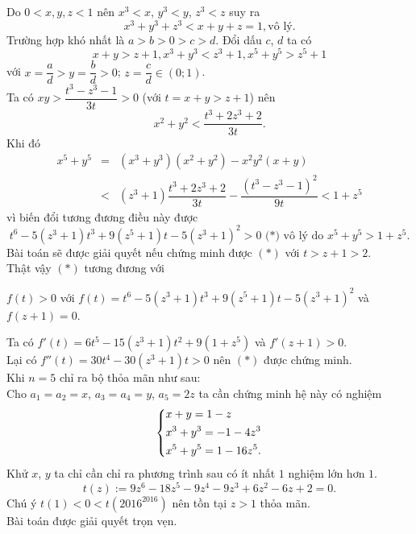 \begin{bt}
{		Do $0<x,y,z<1$ nên $x^3<x$, $y^3<y$, $z^3<z$ suy ra 
		$$x^3+y^3+z^3<x+y+z=1, \text{vô lý}.$$
		Trường hợp khó nhất là $a>b>0>c>d$. Đổi dấu $c$, $d$ ta có
		$$x+y>z+1, x^3+y^3<z^3+1, x^5+y^5>z^5+1$$
		với $x=\dfrac{a}{d}>y=\dfrac{b}{d}>0$; $z=\dfrac{c}{d}\in (0;1)$.\\
		Ta có $xy>\dfrac{t^3-z^3-1}{3t}>0$ (với $t=x+y>z+1$) nên
		$$x^2+y^2<\dfrac{t^3+2z^3+2}{3t}.$$
		Khi đó
		\begin{eqnarray*}
			x^5+y^5 &=& \left(x^3+y^3\right)\left( x^2+y^2 \right)-x^2y^2(x+y)\\
			&<& \left( z^3+1 \right)\dfrac{t^3+2z^3+2}{3t}-\dfrac{\left( t^3-z^3-1 \right)^2}{9t} < 1+z^5
		\end{eqnarray*}
		vì biến đổi tương đương điều này được
		$$t^6-5\left( z^3+1 \right)t^3+9\left( z^5+1 \right)t-5\left( z^3+1 \right)^2>0 \text{ (*) vô lý do } x^5+y^5>1+z^5.$$
		Bài toán sẽ được giải quyết nếu chứng minh được $(*)$ với $t>z+1>2$.\\
		Thật vậy $(*)$ tương đương với
		\begin{center}
			$f(t)>0$ với $f(t)=t^6-5\left(z^3+1 \right)t^3+9\left( z^5+1 \right)t-5\left( z^3+1 \right)^2$ và $f(z+1)=0$.
		\end{center}
		Ta có $f'(t)=6t^5-15\left( z^3+1 \right)t^2+9\left( 1+z^5 \right)$ và $f'(z+1)>0$.\\
		Lại có $f''(t)=30t^4-30\left( z^3+1 \right)t>0$ nên $(*)$ được chứng minh.\\
		Khi $n=5$ chỉ ra bộ thỏa mãn như sau:\\
		Cho $a_1=a_2=x$, $a_3=a_4=y$, $a_5=2z$ ta cần chứng minh hệ này có nghiệm
		$$\left\{\begin{aligned}&x+y=1-z\\&x^3+y^3=-1-4z^3\\&x^5+y^5=1-16z^5.\end{aligned}\right.$$
		Khử $x$, $y$ ta chỉ cần chỉ ra phương trình sau có ít nhất $1$ nghiệm lớn hơn $1$.
		$$t(z):=9z^6-18z^5-9z^4-9z^3+6z^2-6z+2=0.$$
		Chú ý $t(1)<0<t\left( 2016^{2016} \right)$ nên tồn tại $z>1$ thỏa mãn.\\
		Bài toán được giải quyết trọn vẹn.		
	}
\end{bt}


